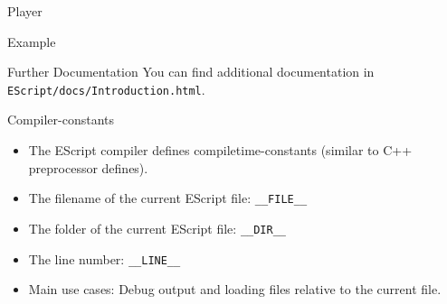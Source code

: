 \documentclass[ucs,9pt]{beamer}
\begin{document}

\begin{frame}{Player}
	\begin{block}{Example}
		
	\end{block}
\end{frame}
%
%
%
\begin{frame}{Further Documentation}
	You can find additional documentation in \texttt{EScript/docs/Introduction.html}.
\end{frame}
%
%
%
%
%
%

\begin{frame}[fragile]{Compiler-constants}
\begin{itemize}
\item The EScript compiler defines compiletime-constants  (similar to C++ preprocessor defines).
\item The filename of the current EScript file: \lstinline!__FILE__!
\item The folder of the current EScript file: \lstinline!__DIR__!
\item The line number: \lstinline!__LINE__!
\item Main use cases: Debug output and loading files relative to the current file.
\end{itemize}
\end{frame}
\end{document}
